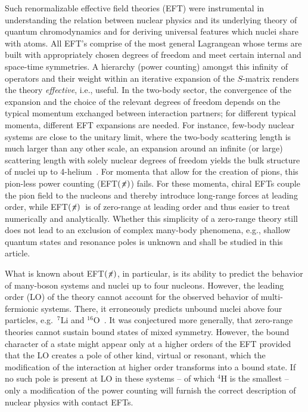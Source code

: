 \documentclass[aps,onecolumn,preprintnumbers,amsmath,amssymb,nofootinbib,superscriptaddress,notitlepage]{revtex4-1}
\newcommand{\eftnopi}{\mbox{EFT$(\not \! \pi)$}}
\begin{document}
%
Such renormalizable effective field theories (EFT) were instrumental in understanding
the relation between nuclear physics and its underlying theory of quantum chromodynamics
and for deriving universal features which nuclei share with atoms.
All EFT's comprise of the most general Lagrangean whose terms are built with
appropriately chosen degrees of freedom and meet certain internal and space-time symmetries.
A hierarchy (power counting) amongst this infinity of operators and their weight within
an iterative expansion of the $S$-matrix renders the theory {\it effective}, i.e., useful.
In the two-body sector, the convergence of the expansion and the choice of the relevant
degrees of freedom depends on the typical momentum exchanged between interaction partners;
for different typical momenta, different EFT expansions are needed. 
For instance, few-body nuclear systems are close to the unitary limit, where the two-body
scattering length is much larger than any other scale, an
expansion around an infinite (or large) scattering length with solely nuclear degrees of freedom
yields the bulk structure of nuclei up to 4-helium~\cite{vanKolck:1999mw}.
For momenta that allow for the creation of pions, this pion-less power counting (\eftnopi)
fails. For these momenta, chiral EFTs couple the pion field to the nucleons and thereby
introduce long-range forces at leading order, while \eftnopi~is of zero-range at
leading order and thus easier to treat numerically and analytically.
Whether this simplicity of a zero-range theory still does not lead to an exclusion
of complex many-body phenomena, e.g., shallow quantum states and resonance poles is
unknown and shall be studied in this article.

What is known about \eftnopi, in particular, is its ability to predict the behavior
of many-boson systems and nuclei up to four nucleons. 
However, the leading order (LO) of the theory cannot account for the observed behavior of
multi-fermionic systems. There, it erroneously predicts unbound nuclei above four
particles, e.g.~$^7$Li and $^{16}$O~\cite{Schafer:2020ivj,Contessi:2017rww}.
It was conjectured more generally, that zero-range theories cannot sustain 
bound states of mixed symmetry.
However, the bound character of a state might appear only at a higher orders of the EFT
provided that the LO creates a pole of other kind, virtual or resonant, which the
modification of the interaction at higher order transforms into a bound state. 
If no such pole is present at LO in these systems -- of which $^4$H is the smallest --
only a modification of the power counting
will furnish the correct description of nuclear physics with contact EFTs.
\end{document}
